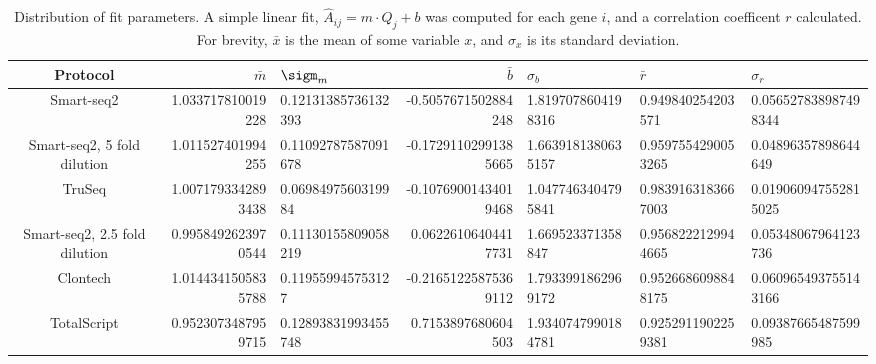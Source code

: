 
\begin{table}[htdp]

\caption{Distribution of fit parameters. A simple linear fit,
             $\hat{A}_{ij} = m \cdot Q_{j} + b$
             was computed for each gene $i$, and a correlation coefficent $r$
             calculated.  For brevity,
             $\bar{x}$ is the mean of some variable $x$, and $\sigma_x$ is its
             standard deviation.  }
             \begin{center}
             \begin{tabular}{|c|r@{$\pm$}l|r@{$\pm$}l||}
             \hline Protocol & $\bar{m}$ & $\sigm_m$ & $\bar{b}$ & $\sigma_b$
                    & $\bar{r}$ & $\sigma_r$ \\\hline
             Smart-seq2 & 1.033717810019228 & 0.12131385736132393 & -0.5057671502884248 & 1.8197078604198316 & 0.949840254203571 & 0.056527838987498344 \\
Smart-seq2, 5 fold dilution & 1.011527401994255 & 0.11092787587091678 & -0.17291102991385665 & 1.6639181380635157 & 0.9597554290053265 & 0.04896357898644649 \\
TruSeq & 1.0071793342893438 & 0.0698497560319984 & -0.10769001434019468 & 1.0477463404795841 & 0.9839163183667003 & 0.019060947552815025 \\
Smart-seq2, 2.5 fold dilution & 0.9958492623970544 & 0.11130155809058219 & 0.06226106404417731 & 1.669523371358847 & 0.9568222129944665 & 0.05348067964123736 \\
Clontech & 1.0144341505835788 & 0.119559945753127 & -0.21651225875369112 & 1.7933991862969172 & 0.9526686098848175 & 0.060965493755143166 \\
TotalScript & 0.9523073487959715 & 0.12893831993455748 & 0.7153897680604503 & 1.9340747990184781 & 0.9252911902259381 & 0.09387665487599985 \\

\hline

\end{tabular}
\label{tab:fits}
\end{center}
\end{table}



              